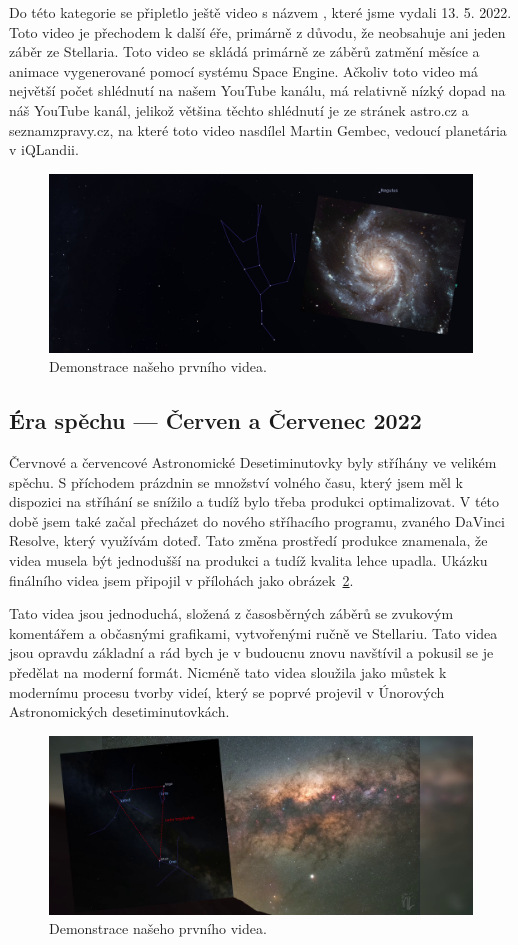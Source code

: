 \documentclass[12pt,a4paper,titlepage]{article}
\begin{document}
Do této kategorie se připletlo ještě video s názvem , které jsme vydali 13. 5. 2022. Toto video je přechodem k další éře, primárně z důvodu, že neobsahuje ani jeden záběr ze Stellaria. Toto video se skládá primárně ze záběrů zatmění měsíce a animace vygenerované pomocí systému Space Engine. Ačkoliv toto video má největší počet shlédnutí na našem YouTube kanálu, má relativně nízký dopad na náš YouTube kanál, jelikož většina těchto shlédnutí je ze stránek astro.cz a seznamzpravy.cz, na které toto video nasdílel Martin Gembec, vedoucí planetária v iQLandii.
\begin{figure}[ht]
	\centering
	\includegraphics[width=.85\textwidth]{brezen.png}
	\caption{Demonstrace našeho prvního videa.}\label{img:brezen}
\end{figure}
\subsection{Éra spěchu --- Červen a Červenec 2022}
Červnové a červencové Astronomické Desetiminutovky byly stříhány ve velikém spěchu. S příchodem prázdnin se množství volného času, který jsem měl k dispozici na stříhání se snížilo a tudíž bylo třeba produkci optimalizovat. V této době jsem také začal přecházet do nového stříhacího programu, zvaného DaVinci Resolve, který využívám doteď. Tato změna prostředí produkce znamenala, že videa musela být jednodušší na produkci a tudíž kvalita lehce upadla. Ukázku finálního videa jsem připojil v přílohách jako obrázek~\ref{img:cervenec}.

Tato videa jsou jednoduchá, složená z časosběrných záběrů se zvukovým komentářem a občasnými grafikami, vytvořenými ručně ve Stellariu. Tato videa jsou opravdu základní a rád bych je v budoucnu znovu navštívil a pokusil se je předělat na moderní formát. Nicméně tato videa sloužila jako můstek k modernímu procesu tvorby videí, který se poprvé projevil v Únorových Astronomických desetiminutovkách.

\begin{figure}[ht]
	\centering
	\includegraphics[width=.85\textwidth]{cervenec.png}
	\caption{Demonstrace našeho prvního videa.}\label{img:cervenec}
\end{figure}
\end{document}
